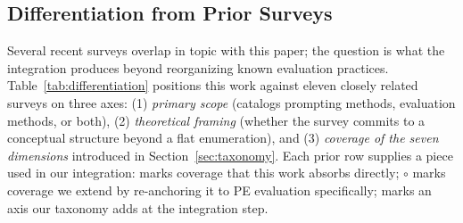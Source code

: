 \documentclass[acmsmall, nonacm, screen]{acmart}
\begin{document}
\subsection{Differentiation from Prior Surveys}
\label{subsec:differentiation}

Several recent surveys overlap in topic with this paper; the
question is what the integration produces beyond reorganizing known
evaluation practices. Table~\ref{tab:differentiation} positions this
work against eleven closely related surveys on three axes: (1)
\textit{primary scope} (catalogs prompting methods, evaluation
methods, or both), (2) \textit{theoretical framing} (whether the
survey commits to a conceptual structure beyond a flat enumeration),
and (3) \textit{coverage of the seven dimensions} introduced in
Section~\ref{sec:taxonomy}. Each prior row supplies a piece used in
our integration: \checkmark{} marks coverage that this work absorbs
directly; $\circ$ marks coverage we extend by re-anchoring it to
PE evaluation specifically; \textendash{} marks an axis our taxonomy
adds at the integration step.
\end{document}
